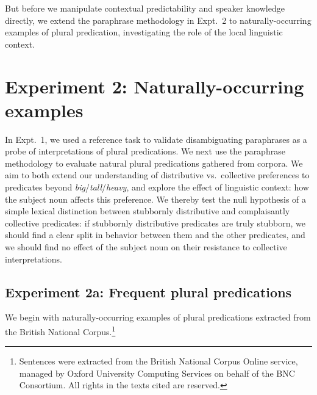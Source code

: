 \documentclass[preprint,12pt,authoryear,titlepage]{elsarticle}
\newcommand{\ndg}[1]{\textcolor{Green}{[ndg: #1]}}
\begin{document}
But before we manipulate contextual predictability and speaker knowledge directly, we extend the paraphrase methodology in Expt.~2 to naturally-occurring examples of plural predication, investigating the role of the local linguistic context.


\section{Experiment 2: Naturally-occurring examples}

In Expt.~1, we used a reference task to validate disambiguating paraphrases as a probe of interpretations of plural predications. 
We next use the paraphrase methodology to evaluate natural plural predications gathered from corpora. We aim to both extend our understanding of distributive vs.~collective preferences to predicates beyond \emph{big}/\emph{tall}/\emph{heavy}, and explore the effect of linguistic context: how the subject noun affects this preference. We thereby test the null hypothesis of a simple lexical distinction between stubbornly distributive and complaisantly collective predicates: if stubbornly distributive predicates are truly stubborn, we should find a clear split in behavior between them and the other predicates, and we should find no effect of the subject noun on their resistance to collective interpretations.


\subsection{Experiment 2a: Frequent plural predications}

We begin with naturally-occurring examples of plural predications extracted from the British National Corpus.\footnote{Sentences were extracted from the British National Corpus Online service, managed by Oxford University Computing Services on behalf of the BNC Consortium. All rights in the texts cited are reserved.}
\end{document}
